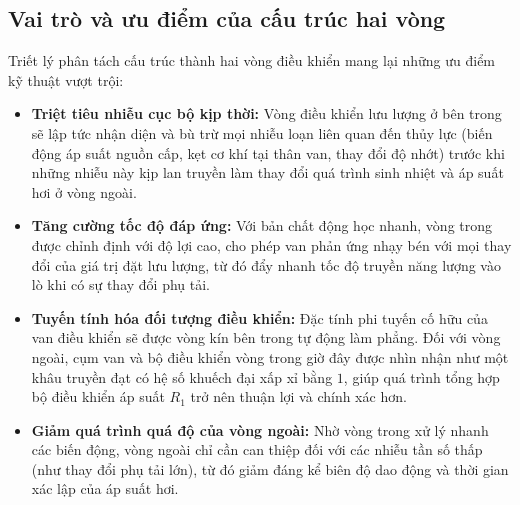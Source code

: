 \documentclass[../main.tex]{subfiles}
\begin{document}


\subsection{Vai trò và ưu điểm của cấu trúc hai vòng}

Triết lý phân tách cấu trúc thành hai vòng điều khiển mang lại những ưu điểm kỹ thuật vượt trội:

\begin{itemize}
    \item \textbf{Triệt tiêu nhiễu cục bộ kịp thời:} Vòng điều khiển lưu lượng ở bên trong sẽ lập tức nhận diện và bù trừ mọi nhiễu loạn liên quan đến thủy lực (biến động áp suất nguồn cấp, kẹt cơ khí tại thân van, thay đổi độ nhớt) trước khi những nhiễu này kịp lan truyền làm thay đổi quá trình sinh nhiệt và áp suất hơi ở vòng ngoài.
    \item \textbf{Tăng cường tốc độ đáp ứng:} Với bản chất động học nhanh, vòng trong được chỉnh định với độ lợi cao, cho phép van phản ứng nhạy bén với mọi thay đổi của giá trị đặt lưu lượng, từ đó đẩy nhanh tốc độ truyền năng lượng vào lò khi có sự thay đổi phụ tải.
    \item \textbf{Tuyến tính hóa đối tượng điều khiển:} Đặc tính phi tuyến cố hữu của van điều khiển sẽ được vòng kín bên trong tự động làm phẳng. Đối với vòng ngoài, cụm van và bộ điều khiển vòng trong giờ đây được nhìn nhận như một khâu truyền đạt có hệ số khuếch đại xấp xỉ bằng $1$, giúp quá trình tổng hợp bộ điều khiển áp suất $R_1$ trở nên thuận lợi và chính xác hơn.
    \item \textbf{Giảm quá trình quá độ của vòng ngoài:} Nhờ vòng trong xử lý nhanh các biến động, vòng ngoài chỉ cần can thiệp đối với các nhiễu tần số thấp (như thay đổi phụ tải lớn), từ đó giảm đáng kể biên độ dao động và thời gian xác lập của áp suất hơi.
\end{itemize}
\end{document}
